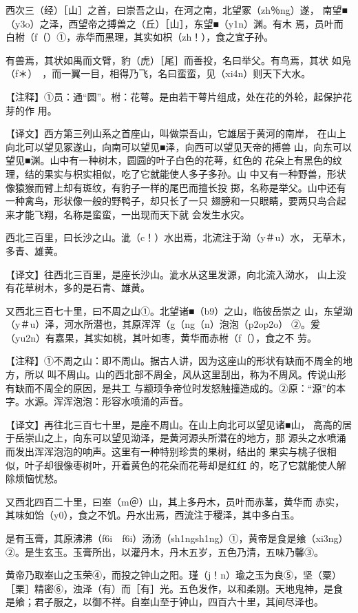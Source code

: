 \documentclass[a4paper,12pt,UTF8,twoside]{ctexbook}
\begin{document}
西次三（经）［山］之首，曰崇吾之山，在河之南，北望冢（zh％ng）遂， 南望■（y3o）之泽，西望帝之搏兽之（丘）［山］，东望■（y1n）渊。有木 焉，员叶而白柎（f（）①，赤华而黑理，其实如枳（zh！），食之宜子孙。

有兽焉，其状如禺而文臂，豹（虎）［尾］而善投，名曰举父。有鸟焉，其状 如凫（f＊）　，而一翼一目，相得乃飞，名曰蛮蛮，见（xi4n）则天下大水。

【注释】①员：通“圆”。柎：花萼。是由若干萼片组成，处在花的外轮，起保护花芽的作 用。

【译文】西方第三列山系之首座山，叫做崇吾山，它雄居于黄河的南岸， 在山上向北可以望见冢遂山，向南可以望见■泽，向西可以望见天帝的搏兽 山，向东可以望见■渊。山中有一种树木，圆圆的叶子白色的花萼，红色的 花朵上有黑色的纹理，结的果实与枳实相似，吃了它就能使人多子多孙。山 中又有一种野兽，形状像猿猴而臂上却有斑纹，有豹子一样的尾巴而擅长投 掷，名称是举父。山中还有一种禽鸟，形状像一般的野鸭子，却只长了一只 翅膀和一只眼睛，要两只鸟合起来才能飞翔，名称是蛮蛮，一出现而天下就 会发生水灾。

西北三百里，曰长沙之山。泚（c！）水出焉，北流注于泑（y＃u）水， 无草木，多青、雄黄。

【译文】往西北三百里，是座长沙山。泚水从这里发源，向北流入泑水， 山上没有花草树木，多的是石青、雄黄。

又西北三百七十里，曰不周之山①。北望诸■（b9）之山，临彼岳崇之 山，东望泑（y＃u）泽，河水所潜也，其原浑浑（g（ng（n）泡泡（p2op2o） ②。爰（yu2n）有嘉果，其实如桃，其叶如枣，黄华而赤柎（f（），食之不 劳。

【注释】①不周之山：即不周山。据古人讲，因为这座山的形状有缺而不周全的地方，所以 叫不周山。山的西北部不周全，风从这里刮出，称为不周风。传说山形有缺而不周全的原因，是共工 与颛顼争帝位时发怒触撞造成的。②原：“源”的本字。水源。浑浑泡泡：形容水喷涌的声音。

【译文】再往北三百七十里，是座不周山。在山上向北可以望见诸■山， 高高的居于岳崇山之上，向东可以望见泑泽，是黄河源头所潜在的地方，那 源头之水喷涌而发出浑浑泡泡的响声。这里有一种特别珍贵的果树，结出的 果实与桃子很相似，叶子却很像枣树叶，开着黄色的花朵而花萼却是红红 的，吃了它就能使人解除烦恼忧愁。

又西北四百二十里，曰峚（m＠）山，其上多丹木，员叶而赤茎，黄华而 赤实，其味如饴（y0），食之不饥。丹水出焉，西流注于稷泽，其中多白玉。

是有玉膏，其原沸沸（f6i　f6i）汤汤（sh1ngsh1ng）①，黄帝是食是飨（xi3ng） ②。是生玄玉。玉膏所出，以灌丹木，丹木五岁，五色乃清，五味乃馨③。

黄帝乃取峚山之玉荣④，而投之钟山之阳。瑾（j！n）瑜之玉为良⑤，坚（粟） ［栗］精密⑥，浊泽（有）而［有］光。五色发作，以和柔刚。天地鬼神，是食 是飨；君子服之，以御不祥。自峚山至于钟山，四百六十里，其间尽泽也。
\end{document}
